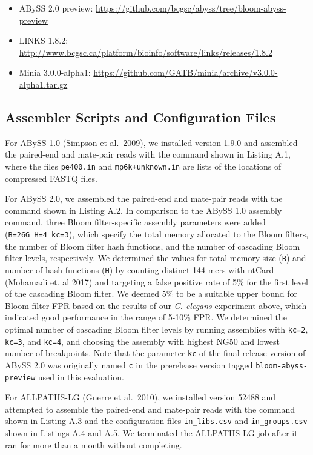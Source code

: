 \documentclass[
  12pt,
  oneside,
  openany]{book}
\providecommand{\tightlist}{%
  \setlength{\itemsep}{0pt}\setlength{\parskip}{0pt}}
\begin{document}
\begin{appendices}
\begin{itemize}
\tightlist
\item
  ABySS 2.0 preview: \url{https://github.com/bcgsc/abyss/tree/bloom-abyss-preview}
\item
  LINKS 1.8.2: \url{http://www.bcgsc.ca/platform/bioinfo/software/links/releases/1.8.2}
\item
  Minia 3.0.0-alpha1: \url{https://github.com/GATB/minia/archive/v3.0.0-alpha1.tar.gz}
\end{itemize}

\hypertarget{assembler-scripts-and-configuration-files}{%
\subsection{Assembler Scripts and Configuration Files}\label{assembler-scripts-and-configuration-files}}

For ABySS 1.0 (Simpson et al.~2009), we installed version 1.9.0 and assembled the paired-end and mate-pair reads with the command shown in Listing A.1, where the files \texttt{pe400.in} and \texttt{mp6k+unknown.in} are lists of the locations of compressed FASTQ files.

For ABySS 2.0, we assembled the paired-end and mate-pair reads with the command shown in Listing A.2. In comparison to the ABySS 1.0 assembly command, three Bloom filter-specific assembly parameters were added (\texttt{B=26G\ H=4\ kc=3}), which specify the total memory allocated to the Bloom filters, the number of Bloom filter hash functions, and the number of cascading Bloom filter levels, respectively. We determined the values for total memory size (\texttt{B}) and number of hash functions (\texttt{H}) by counting distinct 144-mers with ntCard (Mohamadi et. al 2017) and targeting a false positive rate of 5\% for the first level of the cascading Bloom filter. We deemed 5\% to be a suitable upper bound for Bloom filter FPR based on the results of our \emph{C. elegans} experiment above, which indicated good performance in the range of 5-10\% FPR. We determined the optimal number of cascading Bloom filter levels by running assemblies with \texttt{kc=2}, \texttt{kc=3}, and \texttt{kc=4}, and choosing the assembly with highest NG50 and lowest number of breakpoints. Note that the parameter \texttt{kc} of the final release version of ABySS 2.0 was originally named \texttt{c} in the prerelease version tagged \texttt{bloom-abyss-preview} used in this evaluation.

For ALLPATHS-LG (Gnerre et al.~2010), we installed version 52488 and attempted to assemble the paired-end and mate-pair reads with the command shown in Listing A.3 and the configuration files \texttt{in\_libs.csv} and \texttt{in\_groups.csv} shown in Listings A.4 and A.5. We terminated the ALLPATHS-LG job after it ran for more than a month without completing.


\end{appendices}
\end{document}
